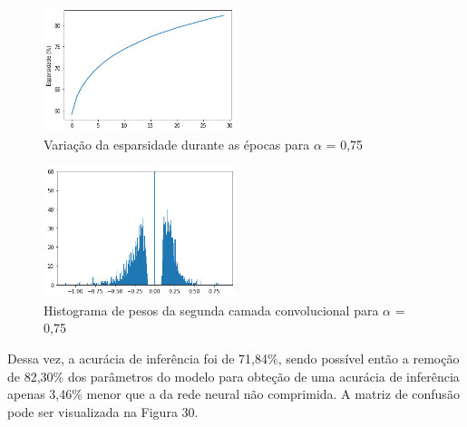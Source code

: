 \begin{figure}[H]
	\includegraphics[width=0.5\textwidth, keepaspectratio=true]{figuras/CAP4/esparsidade075.png}
	\centering
	\caption[Variação da esparsidade durante as épocas para $\alpha$ = 0,75]{Variação da esparsidade durante as épocas para $\alpha$ = 0,75}
\end{figure}

\begin{figure}[H]
	\includegraphics[width=0.5\textwidth, keepaspectratio=true]{figuras/CAP4/hist075_.png}
	\centering
	\caption[Histograma de pesos da segunda camada convolucional para $\alpha$ = 0,75]{Histograma de pesos da segunda camada convolucional para $\alpha$ = 0,75}
\end{figure}

Dessa vez, a acurácia de inferência foi de 71,84\%, sendo possível então a remoção de 82,30\% dos parâmetros do modelo para obteção de uma acurácia de inferência apenas 3,46\% menor que a da rede neural não comprimida. A matriz de confusão pode ser visualizada na Figura 30.

